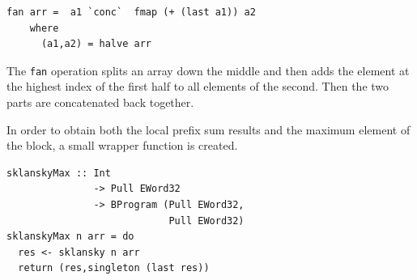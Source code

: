 

\begin{small}
\begin{Verbatim}[samepage=true]
fan arr =  a1 `conc`  fmap (+ (last a1)) a2 
    where 
      (a1,a2) = halve arr
\end{Verbatim} 
\end{small}


The {\tt fan} operation splits an array down the middle and then adds 
the element at the highest index of the first half to all elements of 
the second. Then the two parts are concatenated back together. 

In order to obtain both the local prefix sum results and the maximum 
element of the block, a small wrapper function is created. 

\begin{small}
\begin{Verbatim}[samepage=true]
sklanskyMax :: Int 
               -> Pull EWord32 
               -> BProgram (Pull EWord32, 
                            Pull EWord32)
sklanskyMax n arr = do
  res <- sklansky n arr
  return (res,singleton (last res))
\end{Verbatim}
\end{small} 

